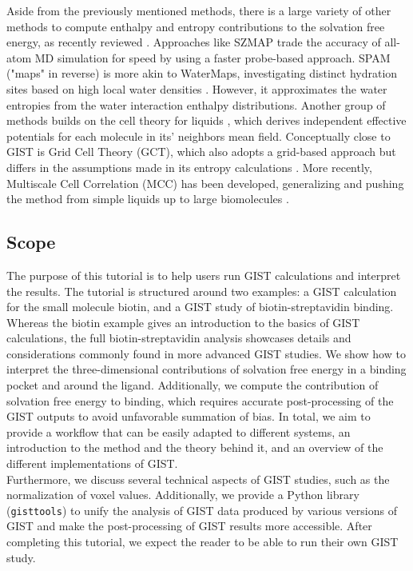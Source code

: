 \documentclass[9pt,tutorial]{livecoms}
\newcommand{\software}{\texttt}
\begin{document}
Aside from the previously mentioned methods, there is a large variety of other methods to compute enthalpy and entropy contributions to the solvation free energy, as recently reviewed \cite{Heyden2019-localsolvation,Mukherjee2022-ReviewSpatialWatersBiomolecule}.
Approaches like SZMAP \cite{Bayden2015-SZMAP} trade the accuracy of all-atom MD simulation for speed by using a faster probe-based approach.
SPAM ("maps" in reverse) is more akin to WaterMaps, investigating distinct hydration sites based on high local water densities \cite{Cui2013-SPAM}. 
However, it approximates the water entropies from the water interaction enthalpy distributions.
Another group of methods builds on the cell theory for liquids \cite{henchman2003partition}, which derives independent effective potentials for each molecule in its' neighbors mean field.
Conceptually close to GIST is Grid Cell Theory (GCT), which also adopts a grid-based approach but differs in the assumptions made in its entropy calculations \cite{Gerogiokas2014-GCT}.
More recently, Multiscale Cell Correlation (MCC) has been developed, generalizing and pushing the method from simple liquids up to large biomolecules \cite{henchman2007free, Hensen2014, Ali2021-hc, Kalayan2022-MCCBiomol}. 

\subsection{Scope}
The purpose of this tutorial is to help users run GIST calculations and interpret the results.
The tutorial is structured around two examples: a GIST calculation for the small molecule biotin, and a GIST study of biotin-streptavidin binding. 
Whereas the biotin example gives an introduction to the basics of GIST calculations, the full biotin-streptavidin analysis showcases details and considerations commonly found in more advanced GIST studies.
We show how to interpret the three-dimensional contributions of solvation free energy in a binding pocket and around the ligand.
Additionally, we compute the contribution of solvation free energy to binding, which requires accurate post-processing of the GIST outputs to avoid unfavorable summation of bias.
In total, we aim to provide a workflow that can be easily adapted to different systems, an introduction to the method and the theory behind it, and an overview of the different implementations of GIST.\\
Furthermore, we discuss several technical aspects of GIST studies, such as the normalization of voxel values. 
Additionally, we provide a Python library (\software{gisttools}) to unify the analysis of GIST data produced by various versions of GIST and make the post-processing of GIST results more accessible.
After completing this tutorial, we expect the reader to be able to run their own GIST study. 
\end{document}
